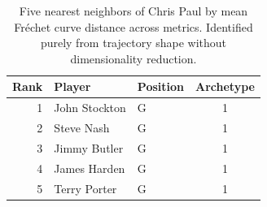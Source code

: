 \begin{table}[htbp]
  \centering\small
  \begin{tabular}{rllc}
    \toprule
    Rank & Player & Position & Archetype \\
    \midrule
    1 & John Stockton & G & 1 \\
    2 & Steve Nash & G & 1 \\
    3 & Jimmy Butler & G & 1 \\
    4 & James Harden & G & 1 \\
    5 & Terry Porter & G & 1 \\
    \bottomrule
  \end{tabular}
  \caption{Five nearest neighbors of Chris Paul by mean Fr\'{e}chet curve distance across metrics. Identified purely from trajectory shape without dimensionality reduction.}
  \label{tab:Chris_Paul_frechet_curve_neighbors}
\end{table}

